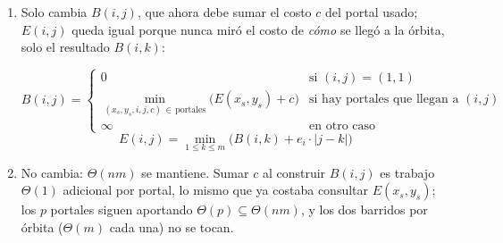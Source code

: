 \begin{enumerate}
  \item Solo cambia $B(i,j)$, que ahora debe sumar el costo $c$ del portal usado; $E(i,j)$ queda igual porque nunca miró el costo de \emph{cómo} se llegó a la órbita, solo el resultado $B(i,k)$:

  \[
  B(i,j) =
  \begin{cases}
  0 & \text{si } (i,j) = (1,1) \\
  \min\limits_{(x_s,y_s,i,j,c) \,\in\, \text{portales}} \big(E(x_s,y_s) + c\big) & \text{si hay portales que llegan a } (i,j) \\
  \infty & \text{en otro caso}
  \end{cases}
  \]
  \[
  E(i,j) = \min_{1 \le k \le m} \big( B(i,k) + e_i \cdot |j-k| \big)
  \]

  \item No cambia: $\Theta(nm)$ se mantiene. Sumar $c$ al construir $B(i,j)$ es trabajo $\Theta(1)$ adicional por portal, lo mismo que ya costaba consultar $E(x_s,y_s)$; los $p$ portales siguen aportando $\Theta(p) \subseteq \Theta(nm)$, y los dos barridos por órbita ($\Theta(m)$ cada una) no se tocan.
\end{enumerate}
